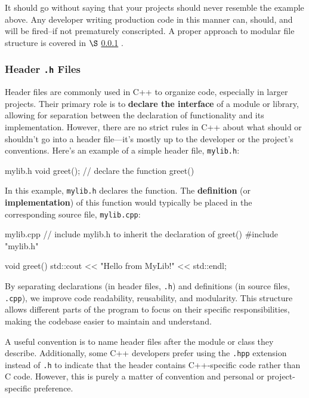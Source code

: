 \documentclass[12pt]{article}
\begin{document}
\noindent
It should go without saying that your projects should never resemble the example above.
Any developer writing production code in this manner can, should, and will be fired--if not prematurely conscripted.
A proper approach to modular file structure is covered in $\S$ \ref{sec:header-files} .

\subsubsection{Header \texttt{.h} Files}
\label{sec:header-files}

\noindent
Header files are commonly used in C++ to organize code, especially in larger projects.
Their primary role is to \textbf{declare the interface} of a module or library, allowing for separation between the declaration of functionality and its implementation.
However, there are no strict rules in C++ about what should or shouldn't go into a header file—it's mostly up to the developer or the project's conventions.
Here's an example of a simple header file, \texttt{mylib.h}:

\begin{cxx}{mylib.h}
void greet(); // declare the function greet()
\end{cxx}

\noindent
In this example, \texttt{mylib.h} declares the  function. 
The \textbf{definition} (or \textbf{implementation}) of this function would typically be placed in the corresponding source file, \texttt{mylib.cpp}:

\begin{cxx}{mylib.cpp}
// include mylib.h to inherit the declaration of greet()
#include "mylib.h"

void greet()
{
	std::cout << "Hello from MyLib!" << std::endl;
}
\end{cxx}

\noindent
By separating declarations (in header files, \texttt{.h}) and definitions (in source files, \texttt{.cpp}), we improve code readability, reusability, and modularity.
This structure allows different parts of the program to focus on their specific responsibilities, making the codebase easier to maintain and understand.

\vspace{1em}
\noindent
A useful convention is to name header files after the module or class they describe.
Additionally, some C++ developers prefer using the \texttt{.hpp} extension instead of \texttt{.h} to indicate that the header contains C++-specific code rather than C code.
However, this is purely a matter of convention and personal or project-specific preference.
\end{document}
